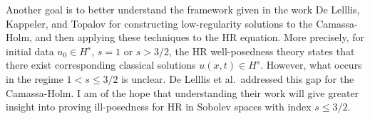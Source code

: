 \documentclass[12pt,reqno]{amsart}
\begin{document}
Another goal is to better understand the framework given in the work De Lelllis,
Kappeler, and Topalov \cite{Lellis_2007_Low-regularity-} for constructing
low-regularity solutions to the Camassa-Holm, and then applying these techniques
to the HR equation. More precisely, for initial data $u_{0} \in H^{s}$, $s =1$
or $s > 3/2$, the HR well-posedness theory states that there exist corresponding
classical solutions $u(x,t) \in H^{s}$. However, what occurs in the regime $1 <
s \le 3/2$ is unclear. De Lelllis et al.\ addressed this gap for the
Camassa-Holm. I am of the hope that understanding their work will give greater
insight into proving ill-posedness for HR in Sobolev spaces with index $s \le
3/2$. 
\providecommand{\bysame}{\leavevmode\hbox to3em{\hrulefill}\thinspace}
\providecommand{\MR}{\relax\ifhmode\unskip\space\fi MR }
\providecommand{\MRhref}[2]{%
  \href{http://www.ams.org/mathscinet-getitem?mr=#1}{#2}
}
\providecommand{\href}[2]{#2}
\end{document}
